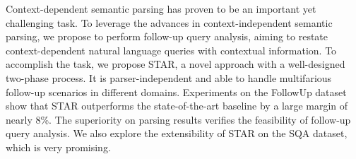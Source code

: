 Context-dependent semantic parsing has proven to be an important yet challenging task. To leverage the advances in context-independent semantic parsing, we propose to perform follow-up query analysis, aiming to restate context-dependent natural language queries with contextual information. To accomplish the task, we propose STAR, a novel approach with a well-designed two-phase process. It is parser-independent and able to handle multifarious follow-up scenarios in different domains. Experiments on the FollowUp dataset show that STAR outperforms the state-of-the-art baseline by a large margin of nearly 8\%. The superiority on parsing results verifies the feasibility of follow-up query analysis. We also explore the extensibility of STAR on the SQA dataset, which is very promising.